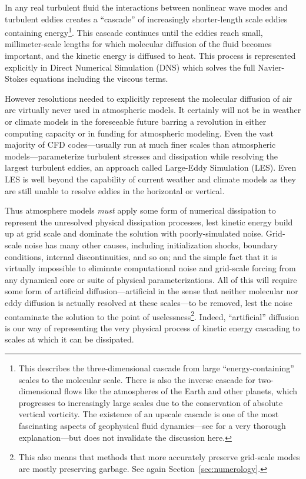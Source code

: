\documentclass[10pt,letterpaper,margin=1in]{memoir}
\begin{document}
In any real turbulent fluid the interactions between nonlinear wave modes and turbulent eddies creates a ``cascade'' of increasingly shorter-length scale eddies containing energy\footnote{This describes the three-dimensional cascade from large ``energy-containing'' scales to the molecular scale. There is also the inverse cascade for two-dimensional flows like the atmospheres of the Earth and other planets, which progresses to increasingly large scales due to the conservation of absolute vertical vorticity. The existence of an upscale cascade is one of the most fascinating aspects of geophysical fluid dynamics---see \citet{Vallis2017} for a very thorough explanation---but does not invalidate the discussion here.}. This cascade continues until the eddies reach small, millimeter-scale lengths for which molecular diffusion of the fluid becomes important, and the kinetic energy is diffused to heat. This process is represented explicitly in Direct Numerical Simulation (DNS) which solves the full Navier-Stokes equations including the viscous terms. 

However resolutions needed to explicitly represent the molecular diffusion of air are virtually never used in atmospheric models. It certainly will not be in weather or climate models in the foreseeable future barring a revolution in either computing capacity or in funding for atmospheric modeling. Even the vast majority of CFD codes---usually run at much finer scales than atmospheric models---parameterize turbulent stresses and dissipation \citep{Pope2000} while resolving the largest turbulent eddies, an approach called Large-Eddy Simulation (LES). Even LES is well beyond the capability of current weather and climate models as they are still unable to resolve eddies in the horizontal or vertical.

Thus atmosphere models \textit{must} apply some form of numerical dissipation to represent the unresolved physical dissipation processes, lest kinetic energy build up at grid scale and dominate the solution with poorly-simulated noise. Grid-scale noise has many other causes, including initialization shocks, boundary conditions, internal discontinuities, and so on; and the simple fact that it is virtually impossible to eliminate computational noise and grid-scale forcing from any dynamical core or suite of physical parameterizations. All of this will require some form of artificial diffusion---artificial in the sense that neither molecular nor eddy diffusion is actually resolved at these scales---to be removed, lest the noise contaminate the solution to the point of uselessness\footnote{This also means that methods that more accurately preserve grid-scale modes are mostly preserving garbage. See again Section~\ref{sec:numerology}.}. Indeed, ``artificial'' diffusion is our way of representing the very physical process of kinetic energy cascading to scales at which it can be dissipated.
\end{document}
